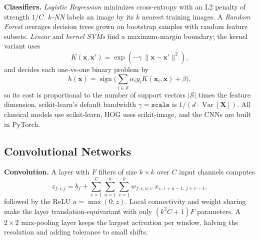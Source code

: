 \documentclass[conference]{IEEEtran}
\begin{document}
\textbf{Classifiers.} \emph{Logistic Regression} minimizes cross-entropy with an L2 penalty of strength $1/C$.
\emph{$k$-NN} labels an image by its $k$ nearest training images. A \emph{Random Forest} averages decision trees grown on
bootstrap samples with random feature subsets. \emph{Linear} and \emph{kernel SVMs} find a maximum-margin boundary; the
kernel variant uses
\begin{equation}
  K(\mathbf{x},\mathbf{x}') = \exp\!\left(-\gamma\,\lVert\mathbf{x}-\mathbf{x}'\rVert^2\right),
  \label{eq:rbf}
\end{equation}
and decides each one-vs-one binary problem by
\begin{equation}
  h(\mathbf{x})=\operatorname{sign}\Big(\sum_{i\in\mathcal{S}}\alpha_i y_i K(\mathbf{x}_i,\mathbf{x})+\beta\Big),
  \label{eq:svm}
\end{equation}
so its cost is proportional to the number of support vectors $|\mathcal{S}|$ times the
feature dimension. scikit-learn's default bandwidth $\gamma=\texttt{scale}$ is $1/(d\cdot\operatorname{Var}[\mathbf{X}])$.
All classical models use scikit-learn, HOG uses scikit-image, and the CNNs are built in PyTorch.

\subsection{Convolutional Networks}
\textbf{Convolution.} A layer with $F$ filters of size $k\times k$ over $C$ input channels computes
\begin{equation}
  z_{f,i,j} = b_f + \sum_{c=1}^{C}\sum_{u=1}^{k}\sum_{v=1}^{k} w_{f,c,u,v}\; x_{c,\,i+u-1,\,j+v-1},
  \label{eq:conv}
\end{equation}
followed by the ReLU $a=\max(0,z)$. Local connectivity and weight sharing make the layer
translation-equivariant with only $(k^2C+1)F$ parameters. A $2\times2$ max-pooling layer keeps the largest activation per
window, halving the resolution and adding tolerance to small shifts.
\end{document}
